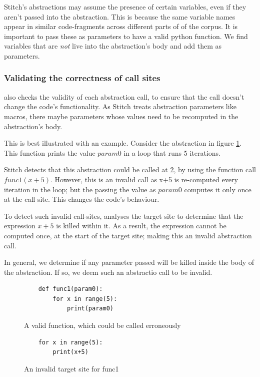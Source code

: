 Stitch's abstractions may assume the presence of certain variables, even if they aren't passed into the abstraction. This is because the same variable names appear in similar code-fragments across different parts of of the corpus. It is important to pass these as parameters to have a valid python function. We find variables that are \textit{not} live into the abstraction's body and add them as parameters. 

\subsubsection{Validating the correctness of call sites}
\toolname also checks the validity of each abstraction call, to ensure that the call doesn't change the code's functionality. As Stitch treats abstraction parameters like macros, there maybe parameters whose values need to be recomputed in the abstraction's body. 

This is best illustrated with an example. Consider the abstraction in figure \ref{fig:possible-invalid-function-call}. This function prints the value $param0$ in a loop that runs 5 iterations.

Stitch detects that this abstraction could be called at \ref{fig:invalid-targetsite}, by using the function call $func1(x+5)$. However, this is an invalid call as x+5 is re-computed every iteration in the loop; but the passing the value as $param0$ computes it only once at the call site. This changes the code's behaviour.

To detect such invalid call-sites, \toolname analyses the target site to determine that the expression $x+5$ is killed within it. As a result, the expression cannot be computed once, at the start of the target site; making this an invalid abstraction call.

In general, we determine if any parameter passed will be killed inside the body of the abstraction. If so, we deem such an abstractio call to be invalid.

\begin{figure}
    \begin{lstlisting}
    def func1(param0):
        for x in range(5):
            print(param0)
    \end{lstlisting}
    \caption{A valid function, which could be called erroneously}
    \label{fig:possible-invalid-function-call}
\end{figure}

\begin{figure}
    \begin{lstlisting}
    for x in range(5):
        print(x+5)
    \end{lstlisting}
    \caption{An invalid target site for func1}
    \label{fig:invalid-targetsite}
\end{figure}

